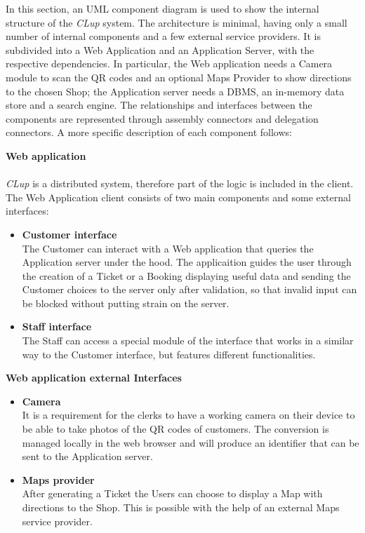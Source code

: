 In this section, an UML component diagram is used to show the internal structure of the \emph{CLup} system.
The architecture is minimal, having only a small number of internal components and a few external service providers. It is subdivided into a Web Application and an Application Server, with the respective dependencies.
In particular, the Web application needs a Camera module to scan the QR codes and an optional Maps Provider to show directions to the chosen Shop; the Application server needs a DBMS, an in-memory data store and a search engine.
The relationships and interfaces between the components are represented through assembly connectors and delegation connectors. 
A more specific description of each component follows:
\linebreak

\noindent\textbf{Web application}\\\\
\emph{CLup} is a distributed system, therefore part of the logic is included in the client. The Web Application client consists of two main components and some external interfaces:
\begin{itemize}
    \item \textbf{Customer interface}\\ The Customer can interact with a Web application that queries the Application server under the hood. The applicaition guides the user through the creation of a Ticket or a Booking displaying useful data and sending the Customer choices to the server only after validation, so that invalid input can be blocked without putting strain on the server.
    \item \textbf{Staff interface}\\ The Staff can access a special module of the interface that works in a similar way to the Customer interface, but features different functionalities. 
    
\end{itemize}
\noindent\textbf{Web application external Interfaces}
\begin{itemize}
    \item \textbf{Camera}\\ It is a requirement for the clerks to have a working camera on their device to be able to take photos of the QR codes of customers. The conversion is managed locally in the web browser and will produce an identifier that can be sent to the Application server. 
    \item \textbf{Maps provider}\\ After generating a Ticket the Users can choose to display a Map with directions to the Shop. This is possible with the help of an external Maps service provider.
\end{itemize}

